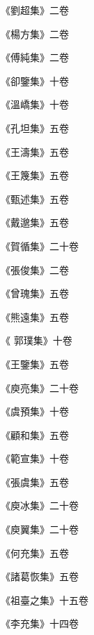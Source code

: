 \begin{pinyinscope}
 《劉超集》二卷



 《楊方集》二卷



 《傅純集》二卷



 《卻鑒集》十卷



 《溫嶠集》十卷



 《孔坦集》五卷



 《王濤集》五卷



 《王篾集》五卷



 《甄述集》五卷



 《戴邈集》五卷



 《賀循集》二十卷



 《張俊集》二卷



 《曾瑰集》五卷



 《熊遠集》五卷



 《
 郭璞集》十卷



 《王鑒集》五卷



 《庾亮集》二十卷



 《虞預集》十卷



 《顧和集》五卷



 《範宣集》十卷



 《張虞集》五卷



 《庾冰集》二十卷



 《庾翼集》二十卷



 《何充集》五卷



 《諸葛恢集》五卷



 《祖臺之集》十五卷



 《李充集》十四卷




\end{pinyinscope}
